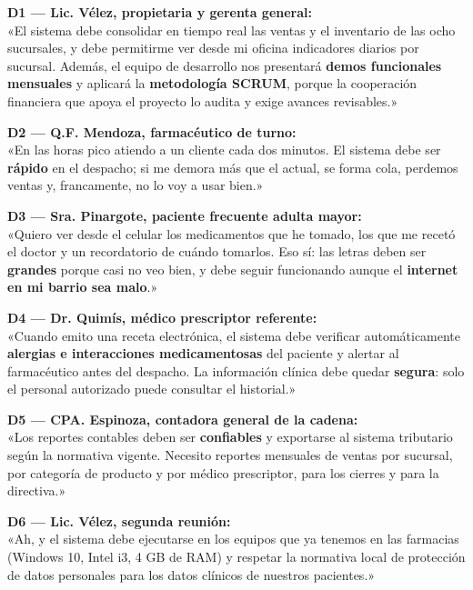 \documentclass[11pt]{article}
\begin{document}
\begin{tcolorbox}[colback=boxgray,colframe=utegreen,boxrule=0.8pt,arc=2mm]
\textbf{D1 --- Lic. Vélez, propietaria y gerenta general:}\\
«El sistema debe consolidar en tiempo real las ventas y el inventario de las ocho sucursales, y debe permitirme ver desde mi oficina indicadores diarios por sucursal. Además, el equipo de desarrollo nos presentará \textbf{demos funcionales mensuales} y aplicará la \textbf{metodología SCRUM}, porque la cooperación financiera que apoya el proyecto lo audita y exige avances revisables.»

\vspace{4pt}
\textbf{D2 --- Q.F. Mendoza, farmacéutico de turno:}\\
«En las horas pico atiendo a un cliente cada dos minutos. El sistema debe ser \textbf{rápido} en el despacho; si me demora más que el actual, se forma cola, perdemos ventas y, francamente, no lo voy a usar bien.»

\vspace{4pt}
\textbf{D3 --- Sra. Pinargote, paciente frecuente adulta mayor:}\\
«Quiero ver desde el celular los medicamentos que he tomado, los que me recetó el doctor y un recordatorio de cuándo tomarlos. Eso sí: las letras deben ser \textbf{grandes} porque casi no veo bien, y debe seguir funcionando aunque el \textbf{internet en mi barrio sea malo}.»

\vspace{4pt}
\textbf{D4 --- Dr. Quimís, médico prescriptor referente:}\\
«Cuando emito una receta electrónica, el sistema debe verificar automáticamente \textbf{alergias e interacciones medicamentosas} del paciente y alertar al farmacéutico antes del despacho. La información clínica debe quedar \textbf{segura}: solo el personal autorizado puede consultar el historial.»

\vspace{4pt}
\textbf{D5 --- CPA. Espinoza, contadora general de la cadena:}\\
«Los reportes contables deben ser \textbf{confiables} y exportarse al sistema tributario según la normativa vigente. Necesito reportes mensuales de ventas por sucursal, por categoría de producto y por médico prescriptor, para los cierres y para la directiva.»

\vspace{4pt}
\textbf{D6 --- Lic. Vélez, segunda reunión:}\\
«Ah, y el sistema debe ejecutarse en los equipos que ya tenemos en las farmacias (Windows 10, Intel i3, 4 GB de RAM) y respetar la normativa local de protección de datos personales para los datos clínicos de nuestros pacientes.»
\end{tcolorbox}
\end{document}

